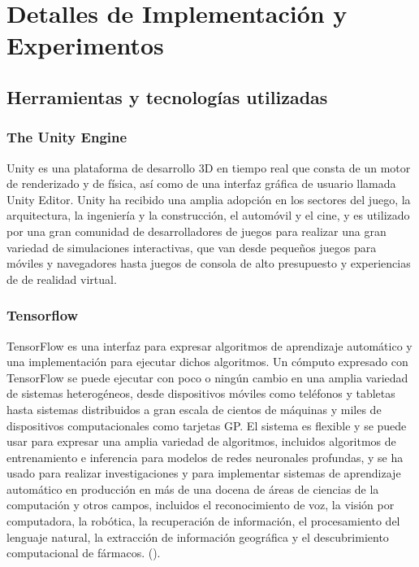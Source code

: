 \chapter{Detalles de Implementación y Experimentos}\label{chapter:implementation}
 
\section{Herramientas y tecnologías utilizadas}
 
\subsection{The Unity Engine}
 
Unity es una plataforma de desarrollo 3D en tiempo real que consta de un motor de renderizado y de física, así como de una interfaz gráfica de usuario llamada Unity Editor. Unity ha recibido una amplia adopción en los sectores del juego, la arquitectura, la ingeniería y la construcción, el automóvil y el cine, y es utilizado por una gran comunidad de desarrolladores de juegos para realizar una gran variedad de simulaciones interactivas, que van desde pequeños juegos para móviles y navegadores hasta juegos de consola de alto presupuesto y experiencias de de realidad virtual.
 
\subsection{Tensorflow}
 
TensorFlow es una interfaz para expresar algoritmos de aprendizaje automático y una implementación para ejecutar dichos algoritmos. Un cómputo expresado con TensorFlow se puede ejecutar con poco o ningún cambio en una amplia variedad de sistemas heterogéneos, desde dispositivos móviles como teléfonos y tabletas hasta sistemas distribuidos a gran escala de cientos de máquinas y miles de dispositivos computacionales como tarjetas GP. El sistema es flexible y se puede usar para expresar una amplia variedad de algoritmos, incluidos algoritmos de entrenamiento e inferencia para modelos de redes neuronales profundas, y se ha usado para realizar investigaciones y para implementar sistemas de aprendizaje automático en producción en más de una docena de áreas de ciencias de la computación y otros campos, incluidos el reconocimiento de voz, la visión por computadora, la robótica, la recuperación de información, el procesamiento del lenguaje natural, la extracción de información geográfica y el descubrimiento computacional de fármacos. (\cite{tensorflow2015-whitepaper}).
 
